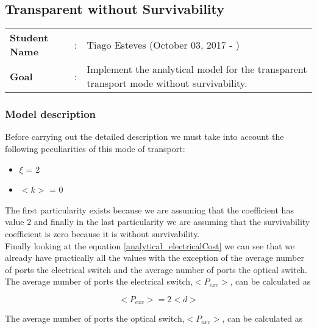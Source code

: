 \clearpage

\subsection{Transparent without Survivability}\label{analytical_Transp_Survivability}
\begin{tcolorbox}	
\begin{tabular}{p{2.75cm} p{0.2cm} p{10.5cm}} 	
\textbf{Student Name}  &:& Tiago Esteves    (October 03, 2017 - )\\
\textbf{Goal}          &:& Implement the analytical model for the transparent transport mode without survivability.
\end{tabular}
\end{tcolorbox}

\subsubsection{Model description}

Before carrying out the detailed description we must take into account the following peculiarities of this mode of transport:
\begin{itemize}
  \item $\xi$ = 2
  \item $<k>$ = 0
\end{itemize}

\vspace{11pt}
The first particularity exists because we are assuming that the coefficient has value 2 and finally in the last particularity we are assuming that the survivability coefficient is zero because it is without survivability.\\

Finally looking at the equation \ref{analytical_electricalCost} we can see that we already have practically all the values with the exception of the average number of ports the electrical switch and the average number of ports the optical switch.\\

The average number of ports the electrical switch,$<P_{exc}>$, can be calculated as

\begin{equation}
<P_{exc}> = 2 <d>
\label{Pexc_transp}
\end{equation}
\vspace{11pt}

The average number of ports the optical switch,$<P_{oxc}>$, can be calculated as

